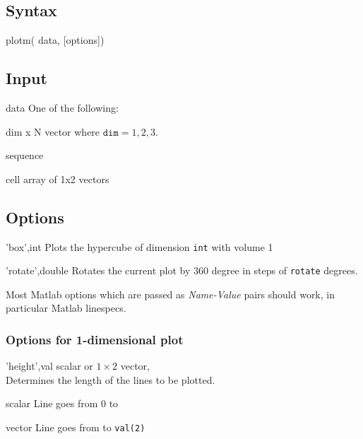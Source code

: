 
\subsection*{Syntax}
\begin{param}
    \item[{plotm( data, [options])}]
\end{param}

\subsection*{Input}
\begin{param}
    \item[data] One of the following:
    \begin{param}
        \item[dim x N vector] where $\texttt{dim}=1,2,3$.
        \item[sequence]
        \item[cell array of 1x2 vectors]
    \end{param}
\end{param}

\subsection*{Options}
\begin{param}

\item['box',int]        Plots the hypercube of dimension \texttt{int} with volume 1
\item['rotate',double]  Rotates the current plot by 360 degree in steps of \texttt{rotate} degrees.
\item[\textbullet] Most Matlab options which are passed as \emph{Name-Value} pairs should work, 
in particular Matlab linespecs.
\end{param}

\subsubsection*{Options for 1-dimensional plot}
\begin{param}
\item['height',val]     scalar or $1\times 2$ vector, \\
                        Determines the length of the lines to be plotted.
    \begin{param}                        
    \item[scalar] Line goes from 0 to 
    \item[vector] Line goes from  to \texttt{val(2)}
    \end{param}                        
\end{param}

